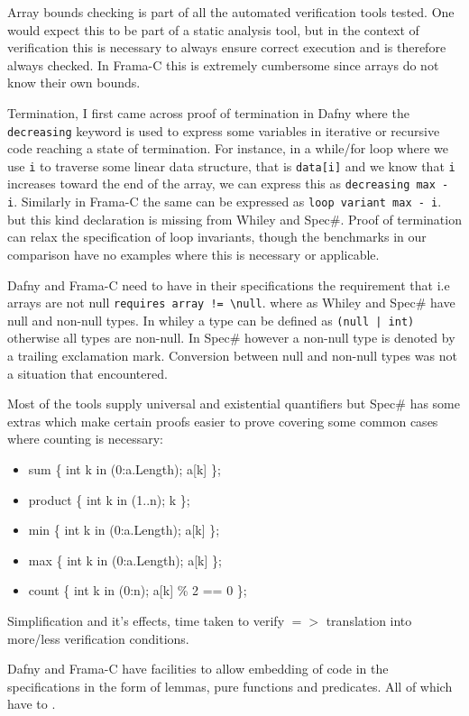 \documentclass[10pt]{article} %
\begin{document}
Array bounds checking is part of all the automated verification tools tested. One would expect this to be part of a static analysis tool, but in the context of verification this is necessary to always ensure correct execution and is therefore always checked. In Frama-C this is extremely cumbersome since arrays do not know their own bounds.

Termination, I first came across proof of termination in Dafny where the \verb/decreasing/ keyword is used to express some variables in iterative or recursive code reaching a state of termination. For instance, in a while/for loop where we use \verb/i/ to traverse some linear data structure, that is \verb/data[i]/ and we know that \verb/i/ increases toward the end of the array, we can express this as \verb/decreasing max - i/. Similarly in Frama-C the same can be expressed as \verb/loop variant max - i/. but this kind declaration is missing from Whiley and Spec\#. Proof of termination can relax the specification of loop invariants, though the benchmarks in our comparison have no examples where this is necessary or applicable.

Dafny and Frama-C need to have in their specifications the requirement that i.e arrays are not null \verb/requires array != \null/. where as Whiley and Spec\# have null and non-null types. In whiley a type can be defined as \verb/(null | int)/ otherwise all types are non-null. In Spec\# however a non-null type is denoted by a trailing exclamation mark. Conversion between null and non-null types was not a situation that encountered.

Most of the tools supply universal and existential quantifiers but Spec\# has some extras which make certain proofs easier to prove covering some common cases where counting is necessary:
\begin{itemize}
\item sum \{ int k in (0:a.Length); a[k] \};
\item product \{ int k in (1..n); k \};
\item min \{ int k in (0:a.Length); a[k] \};
\item max \{ int k in (0:a.Length); a[k] \};
\item count \{ int k in (0:n); a[k] \% 2 == 0 \};
\end{itemize}

Simplification and it's effects, time taken to verify $=>$ translation into more/less verification conditions.

Dafny and Frama-C have facilities to allow embedding of code in the specifications in the form of  lemmas, pure functions and predicates. All of which have to . 
\end{document}
